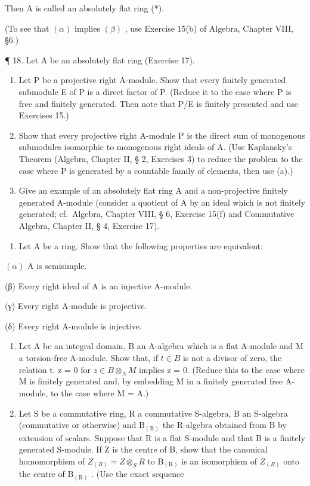 Then A is called an absolutely flat ring (*).

(To see that \((\alpha)\) implies \((\beta)\) , use Exercise 15(b) of Algebra, Chapter VIII, §6.)

¶ 18. Let A be an absolutely flat ring (Exercise 17).

\begin{enumerate}
\def\labelenumi{(\alph{enumi})}
\item
  Let P be a projective right A-module. Show that every finitely generated submodule E of P is a direct factor of P. (Reduce it to the case where P is free and finitely generated. Then note that P/E is finitely presented and use Exercises 15.)
\item
  Show that every projective right A-module P is the direct sum of monogenous submodules isomorphic to monogenous right ideals of A. (Use Kaplansky's Theorem (Algebra, Chapter II, § 2, Exercises 3) to reduce the problem to the case where P is generated by a countable family of elements, then use (a).)
\item
  Give an example of an absolutely flat ring A and a non-projective finitely generated A-module (consider a quotient of A by an ideal which is not finitely generated; cf.~Algebra, Chapter VIII, § 6, Exercise 15(f) and Commutative Algebra, Chapter II, § 4, Exercise 17).
\end{enumerate}

\begin{enumerate}
\def\labelenumi{\arabic{enumi}.}
\setcounter{enumi}{18}
\tightlist
\item
  Let A be a ring. Show that the following properties are equivalent:
\end{enumerate}

\((\alpha)\) A is semisimple.

(β) Every right ideal of A is an injective A-module.

(γ) Every right A-module is projective.

(δ) Every right A-module is injective.

\begin{enumerate}
\def\labelenumi{\arabic{enumi}.}
\setcounter{enumi}{19}
\item
  Let A be an integral domain, B an A-algebra which is a flat A-module and M a torsion-free A-module. Show that, if \(t \in B\) is not a divisor of zero, the relation t. z = 0 for \(z \in B \otimes_{A} M\) implies z = 0. (Reduce this to the case where M is finitely generated and, by embedding M in a finitely generated free A-module, to the case where M = A.)
\item
  Let S be a commutative ring, R a commutative S-algebra, B an S-algebra (commutative or otherwise) and \(\mathrm{B}_{(\mathrm{R})}\) the R-algebra obtained from B by extension of scalars. Suppose that R is a flat S-module and that B is a finitely generated S-module. If Z is the centre of B, show that the canonical homomorphism of \(Z_{(R)} = Z \otimes_{S} R\) to \(\mathrm{B}_{(\mathrm{R})}\) is an isomorphism of \(Z_{(R)}\) onto the centre of \(\mathrm{B}_{(\mathrm{R})}\) . (Use the exact sequence
\end{enumerate}

